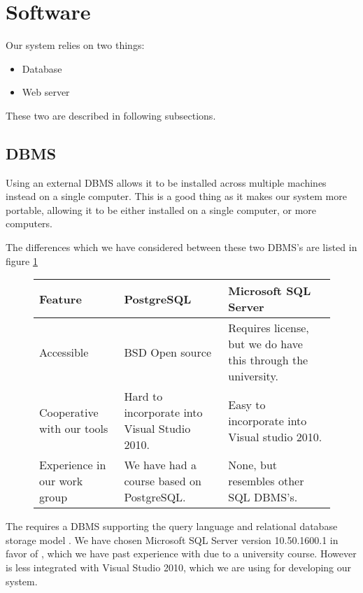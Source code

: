 \section{Software}
\label{sec:software}

Our system relies on two things:

\begin{itemize}
	\item Database
	\item Web server
\end{itemize}

These two are described in following subsections.

\subsection{DBMS}
\label{subsec:dbms}

Using an external DBMS allows it to be installed across multiple machines instead on a single computer. This is a good thing as it makes our system more portable, allowing it to be either installed on a single computer, or more computers.

The differences which we have considered between these two DBMS's are listed in figure \ref{fig:DBMS}\cite{postgres08}

\begin{figure}[htb]
	\centering
		\begin{tabularx}{\textwidth}{L|L|L}
			\textbf{Feature}&\textbf{PostgreSQL}&\textbf{Microsoft SQL Server} \\
			\hline
			Accessible&BSD Open source&Requires license, but we do have this through the university. \\ 
			Cooperative with our tools&Hard to incorporate into Visual Studio 2010. & Easy to incorporate into Visual studio 2010. \\ 
			Experience in our work group&We have had a course based on PostgreSQL. & None, but resembles other SQL DBMS's. \\ 
		\end{tabularx}
	\label{fig:DBMS}
\end{figure}

The \hdesk requires a DBMS supporting the query language \sql[] and relational database storage model .
We have chosen Microsoft SQL Server version 10.50.1600.1 in favor of \posgresql[], which we have past experience with due to a university course.
However \posgresql[] is less integrated with Visual Studio 2010, which we are using for developing our system.

